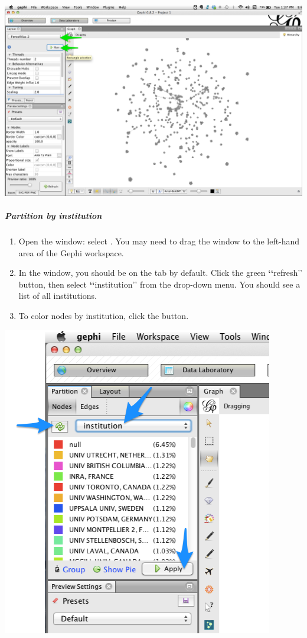 \documentclass[letterpaper,10pt,english]{sphinxmanual}
\begin{document}
{\hfill\includegraphics{coauthors.25.png}\hfill}


\subparagraph{Partition by institution}
\label{tutorial.coauthors:partition-by-institution}\begin{enumerate}
\item {} 
Open the  window: select . You may need to drag the
window to the left-hand area of the Gephi workspace.

\item {} 
In the  window, you should be on the  tab by default. Click the
green {\color{red}\bfseries{}{}`{}`}refresh’’ button, then select {\color{red}\bfseries{}{}`{}`}institution’’ from the drop-down menu. You
should see a list of all institutions.

\item {} 
To color nodes by institution, click the  button.

\end{enumerate}

{\hfill\includegraphics{coauthors.26.png}\hfill}
\end{document}
